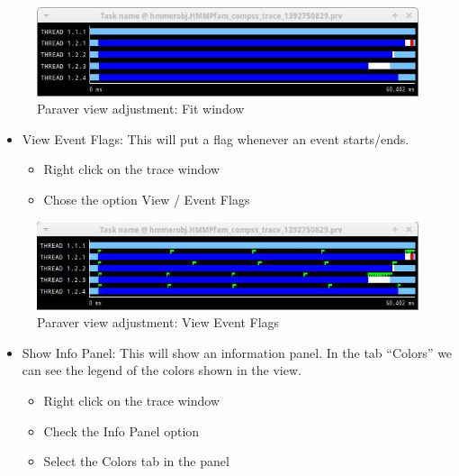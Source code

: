 \begin{figure}[ht!]
  \centering
    \includegraphics[width=1.0\textwidth]{./Sections/3_Visualization/Figures/3.jpeg}
    \caption{Paraver view adjustment: Fit window}
\end{figure}

\begin{itemize} 
 \item View Event Flags: This will put a flag whenever an event starts/ends.
	\begin{itemize}
	    \item Right click on the trace window
	    \item Chose the option View / Event Flags
	\end{itemize}
\end{itemize}
 
\begin{figure}[ht!]
  \centering
    \includegraphics[width=1.0\textwidth]{./Sections/3_Visualization/Figures/4.jpeg}
    \caption{Paraver view adjustment: View Event Flags}
\end{figure}

\begin{itemize}
 \item Show Info Panel: This will show an information panel. In the tab ``Colors'' we can see the legend of the colors shown in the view.
	\begin{itemize}
	    \item Right click on the trace window
	    \item Check the Info Panel option
	    \item Select the Colors tab in the panel
	\end{itemize}
\end{itemize}

